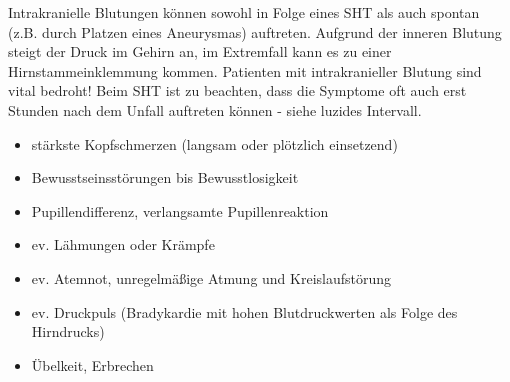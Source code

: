 {Intrakranielle Blutungen können sowohl in Folge eines SHT
als auch spontan (z.B. durch Platzen eines Aneurysmas)
auftreten. Aufgrund der inneren Blutung steigt der Druck im
Gehirn an, im Extremfall kann es zu einer
Hirnstammeinklemmung kommen. Patienten mit intrakranieller
Blutung sind vital bedroht! Beim SHT ist zu beachten, dass
die Symptome oft auch erst Stunden nach dem Unfall auftreten
können - siehe luzides Intervall. 
}{
\begin{itemize}
    \item stärkste Kopfschmerzen (langsam oder plötzlich einsetzend)
    \item Bewusstseinsstörungen bis Bewusstlosigkeit
    \item Pupillendifferenz, verlangsamte Pupillenreaktion
    \item ev. Lähmungen oder Krämpfe
    \item ev. Atemnot, unregelmäßige Atmung und Kreislaufstörung
    \item ev. Druckpuls (Bradykardie mit hohen Blutdruckwerten als Folge des
    Hirndrucks)
    \item Übelkeit, Erbrechen
\end{itemize}
}{}{}{}










